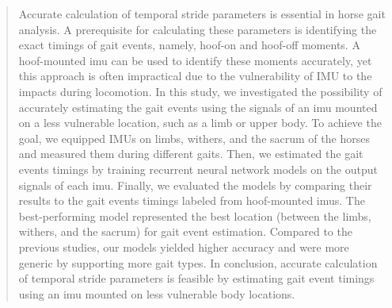 \begin{quote}
Accurate calculation of temporal stride parameters is essential in horse gait analysis. A prerequisite for calculating these parameters is identifying the exact timings of gait events, namely, hoof-on and hoof-off moments. A hoof-mounted \gls{imu} can be used to identify these moments accurately, yet this approach is often impractical due to the vulnerability of IMU to the impacts during locomotion. In this study, we investigated the possibility of accurately estimating the gait events using the signals of an \gls{imu} mounted on a less vulnerable location, such as a limb or upper body. To achieve the goal, we equipped IMUs on limbs, withers, and the sacrum of the horses and measured them during different gaits. Then, we estimated the gait events timings by training recurrent neural network models on the output signals of each \gls{imu}. Finally, we evaluated the models by comparing their results to the gait events timings labeled from hoof-mounted \gls{imu}s. The best-performing model represented the best location (between the limbs, withers, and the sacrum) for gait event estimation. Compared to the previous studies, our models yielded higher accuracy and were more generic by supporting more gait types. In conclusion, accurate calculation of temporal stride parameters is feasible by estimating gait event timings using an \gls{imu} mounted on less vulnerable body locations.
\end{quote}

